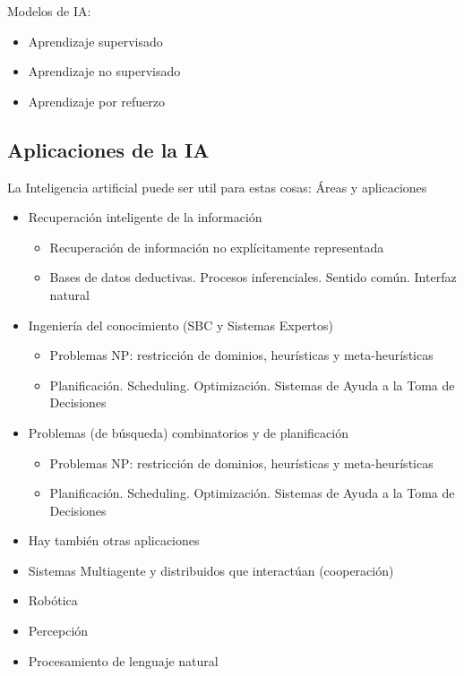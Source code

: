 {Modelos de IA:\ns
\begin{itemize}
	\item Aprendizaje supervisado
	\item Aprendizaje no supervisado
	\item Aprendizaje por refuerzo
\end{itemize}}

\subsection{Aplicaciones de la IA}
La Inteligencia artificial puede ser util para estas cosas:
Áreas y aplicaciones
\begin{itemize}
	\item Recuperación inteligente de la información
	      \begin{itemize}
		      \item Recuperación de información no explícitamente representada
		      \item Bases de datos deductivas. Procesos inferenciales. Sentido común. Interfaz natural
	      \end{itemize}
	\item Ingeniería del conocimiento (SBC y Sistemas Expertos)
	      \begin{itemize}
		      \item Problemas NP: restricción de dominios, heurísticas y meta-heurísticas
		      \item Planificación. Scheduling. Optimización. Sistemas de Ayuda a la Toma
		            de Decisiones

	      \end{itemize}
	\item Problemas (de búsqueda) combinatorios y de planificación
	      \begin{itemize}
		      \item Problemas NP: restricción de dominios, heurísticas y meta-heurísticas
		      \item Planificación. Scheduling. Optimización. Sistemas de Ayuda a la Toma
		            de Decisiones
	      \end{itemize}
	\item[] Hay también otras aplicaciones
	\item Sistemas Multiagente y distribuidos que interactúan (cooperación)
	\item Robótica
	\item Percepción
	\item Procesamiento de lenguaje natural
\end{itemize}


\newpage